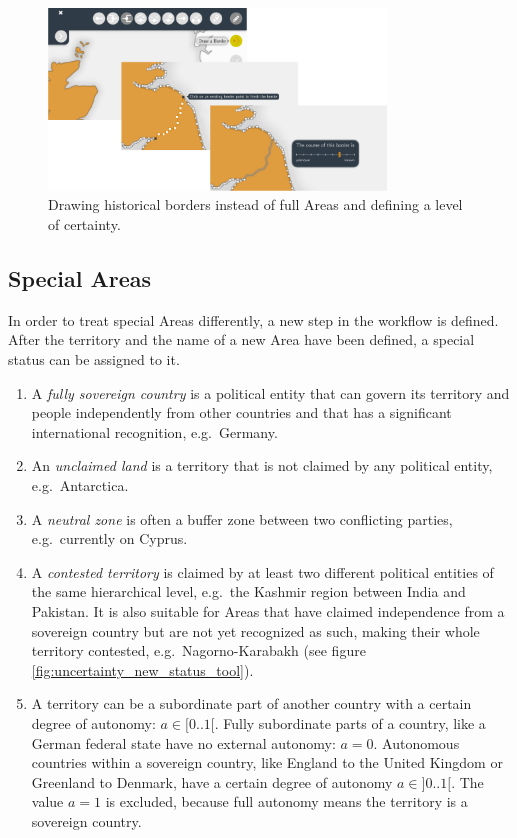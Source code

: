 \begin{figure}[ht]
  \vspace{1em}
  \centering
  \includegraphics[width = 0.8\textwidth]{graphics/extensions/new_territory_tool}
  \caption{Drawing historical borders instead of full Areas and defining a level of certainty.}
  \label{fig:uncertainty_new_territory_tool}
\end{figure}


\subsection{Special Areas} %
\label{sub:special_areas}

In order to treat special Areas differently, a new step in the workflow is defined. After the territory and the name of a new Area have been defined, a special status can be assigned to it.

\begin{enumerate}
  \item A \emph{fully sovereign country} is a political entity
  that can govern its territory and people independently from other countries and that has a significant international recognition, e.g.\ Germany.
  \item An \emph{unclaimed land} is a territory that is not claimed by any political entity, e.g.\ Antarctica.
  \item A \emph{neutral zone} is often a buffer zone between two conflicting parties, e.g.\ currently on Cyprus.
  \item A \emph{contested territory} is claimed by at least two different political entities of the same hierarchical level, e.g.\ the Kashmir region between India and Pakistan. It is also suitable for Areas that have claimed independence from a sovereign country but are not yet recognized as such, making their whole territory contested, e.g.\ Nagorno-Karabakh (see figure \ref{fig:uncertainty_new_status_tool}).
  \item A territory can be a subordinate part of another country with a certain degree of autonomy: $a\in [0..1[$. Fully subordinate parts of a country, like a German federal state have no external autonomy: $a=0$. Autonomous countries within a sovereign country, like England to the United Kingdom or Greenland to Denmark, have a certain degree of autonomy $a \in ]0..1[$. The value $a=1$ is excluded, because full autonomy means the territory is a sovereign country.
\end{enumerate}

